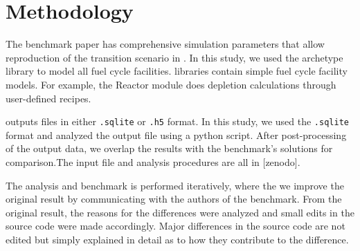 \section{Methodology}

The benchmark paper \cite{feng_standardized_2016}
has comprehensive simulation parameters that allow
reproduction of the transition scenario in \Cyclus.
In this study, we used the \Cycamore \cite{huff_fundamental_2016}
 archetype library to model
all fuel cycle facilities. \Cycamore libraries contain
simple fuel cycle facility models. For example,
the Reactor module does depletion calculations through
user-defined recipes.

\Cyclus outputs files in either \texttt{.sqlite} or
\texttt{.h5} format. In this study, we used the
\texttt{.sqlite} format and analyzed the output file
using a python script. After post-processing of the
output data, we overlap the results with the
benchmark's solutions for comparison.The input file
and analysis procedures are all in [zenodo].

The analysis and benchmark is performed iteratively,
where the we improve the original result by communicating
with the authors of the benchmark. From the original result,
the reasons for the differences were analyzed and
small edits in the source code were made accordingly.
Major differences in the source code are not edited but
simply explained in detail as to how they contribute
to the difference.
